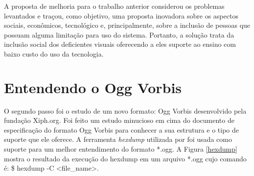 A proposta de melhoria para o trabalho anterior considerou os problemas levantados e traçou, como objetivo, uma proposta inovadora sobre os aspectos sociais, econômicos, tecnológico e, principalmente, sobre a inclusão de pessoas que possuam alguma limitação para uso do sistema. Portanto, a solução trata da inclusão social dos deficientes visuais oferecendo a eles suporte ao ensino com baixo custo do uso da tecnologia.


\section{Entendendo o Ogg Vorbis}

O segundo passo foi o estudo de um novo formato: Ogg Vorbis desenvolvido pela fundação Xiph.org. Foi feito um estudo minucioso em cima do documento de especificação do formato Ogg Vorbis para conhecer a sua estrutura e o tipo de suporte que ele oferece. A ferramenta \textit{hexdump} utilizada por \cite{herbert} foi usada como suporte para um melhor entendimento do formato *.ogg. A Figura \ref{hexdump} mostra o resultado da execução do hexdump em um arquivo *.ogg cujo comando é: \$ hexdump -C <file\_name>.

